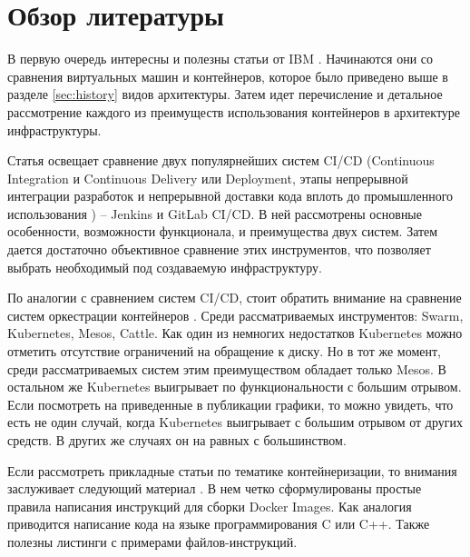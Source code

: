 \section{Обзор литературы}
\label{sec:lit-rev}

В первую очередь интересны и полезны статьи от IBM \cite{ibm:containers1}\cite{ibm:containers2}. Начинаются они со сравнения виртуальных машин и контейнеров, которое было приведено выше в разделе \ref{sec:history} видов архитектуры. Затем идет перечисление и детальное рассмотрение каждого из преимуществ использования контейнеров в архитектуре инфраструктуры.

Статья \cite{habr:ruvds:jenkins-vs-gitlab} освещает сравнение двух популярнейших систем CI/CD (Continuous Integration и Continuous Delivery или Deployment, этапы непрерывной интеграции разработок и непрерывной доставки кода вплоть до промышленного использования \cite{habr:flant:k8s-and-gitlab})
-- Jenkins и GitLab CI/CD. В ней рассмотрены основные особенности, возможности функционала, и преимущества двух систем. Затем дается достаточно объективное сравнение этих инструментов, что позволяет выбрать необходимый под создаваемую инфраструктуру.

По аналогии с сравнением систем CI/CD, стоит обратить внимание на сравнение систем оркестрации контейнеров \cite{al2019container}. Среди рассматриваемых инструментов: Swarm, Kubernetes, Mesos, Cattle. Как один из немногих недостатков Kubernetes можно отметить отсутствие ограничений на обращение к диску. Но в тот же момент, среди рассматриваемых систем этим преимуществом обладает только Mesos. В остальном же Kubernetes выигрывает по функциональности с большим отрывом. Если посмотреть на приведенные в публикации графики, то можно увидеть, что есть не один случай, когда Kubernetes выигрывает с большим отрывом от других средств. В других же случаях он на равных с большинством.

Если рассмотреть прикладные статьи по тематике контейнеризации, то внимания заслуживает следующий материал \cite{nust2020ten}. В нем четко сформулированы простые правила написания инструкций для сборки Docker Images. Как аналогия приводится написание кода на языке программирования C или C++. Также полезны листинги с примерами файлов-инструкций.

